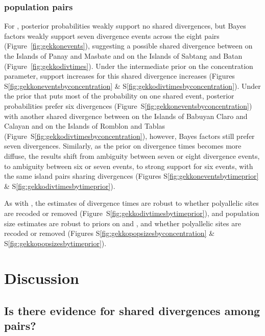 \subsubsection{ population pairs}
For , posterior probabilities weakly support no shared divergences,
but Bayes factors weakly support seven divergence events across the eight pairs
(Figure~\ref{fig:gekkonevents}),
suggesting a possible shared divergence between
 on the Islands of Panay and Masbate
and
 on the Islands of Sabtang and Batan
(Figure~\ref{fig:gekkodivtimes}).
Under the intermediate prior on the concentration parameter, support
increases for this shared divergence increases 
(Figures
S\ref{fig:gekkoneventsbyconcentration}
\&
S\ref{fig:gekkodivtimesbyconcentration}).
Under the prior that puts most of the probability on one shared event,
posterior probabilities prefer six divergences
(Figure~S\ref{fig:gekkoneventsbyconcentration})
with another shared divergence between
 on the Islands of Babuyan Claro and Calayan
and
 on the Islands of Romblon and Tablas
(Figure~S\ref{fig:gekkodivtimesbyconcentration}), however,
Bayes factors still prefer seven divergences.
Similarly, as the prior on divergence times becomes more diffuse,
the results shift from ambiguity between seven or eight divergence
events, to ambiguity between six or seven events, to strong
support for six events, with the same island pairs sharing
divergences
(Figures
S\ref{fig:gekkoneventsbytimeprior}
\&
S\ref{fig:gekkodivtimesbytimeprior}).

As with , the estimates of divergence times
are robust to whether polyallelic sites are recoded or removed
(Figure~S\ref{fig:gekkodivtimesbytimeprior}),
and population size estimates are robust to 
priors on \concentration and \divtime, and whether polyallelic sites
are recoded or removed
(Figures
S\ref{fig:gekkopopsizesbyconcentration}
\&
S\ref{fig:gekkopopsizesbytimeprior}).

\section{Discussion}

\subsection{Is there evidence for shared divergences among  pairs?}

